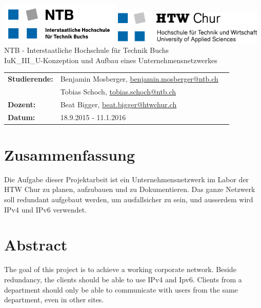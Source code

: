 \documentclass[11pt,a4paper]{scrreprt}
\begin{document}
\thispagestyle{empty}
\begin{center}
	\includegraphics[height=2cm]{logo_ntb.png}
	\hspace*{6cm}
	\includegraphics[height=1.6cm]{logo_htw.png}\\
	\vspace{5cm}
	\Large{NTB - Interstaatliche Hochschule für Technik Buchs}\\
	\vspace{3cm}
	\Huge{IuK\_III\_U-Konzeption und Aufbau eines Unternehmensnetzwerkes}\\
	\vspace{6cm}
	\Large{}
	\doublespacing
	\begin{tabular}{lll}
		\textbf{Studierende:} & Benjamin Mosberger, \href{mailto:benjamin.mosberger@ntb.ch} {benjamin.mosberger@ntb.ch}\\ 
		& Tobias Schoch, \href{mailto:tobias.schoch@ntb.ch} {tobias.schoch@ntb.ch}\\
		\textbf{Dozent:} & Beat Bigger, \href{mailto: beat.bigger@htwchur.ch}{beat.bigger@htwchur.ch} \\
		\textbf{Datum:} & 18.9.2015 - 11.1.2016
	\end{tabular}	
\end{center}
\restoregeometry
\pagebreak

\setcounter{page}{1}
\onehalfspacing 

\section*{Zusammenfassung}
Die Aufgabe dieser Projektarbeit ist ein Unternehmensnetzwerk im Labor der HTW Chur zu planen, aufzubauen und zu Dokumentieren. Das ganze Netzwerk soll redundant aufgebaut werden, um ausfallsicher zu sein, und ausserdem wird IPv4 und IPv6 verwendet.


\vspace{4cm}

\section*{Abstract}
The goal of this project is to achieve a working corporate network. Beside redundancy, the clients should be able to use IPv4 and Ipv6. Clients from a department should only be able to communicate with users from the same department, even in other sites.
\end{document}
